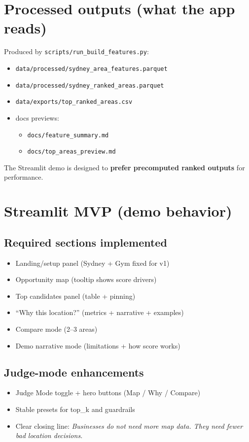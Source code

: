 \documentclass[11pt]{article}
\begin{document}
\section{Processed outputs (what the app reads)}
\noindent Produced by \texttt{scripts/run\_build\_features.py}:
\begin{itemize}
  \item \texttt{data/processed/sydney\_area\_features.parquet}
  \item \texttt{data/processed/sydney\_ranked\_areas.parquet}
  \item \texttt{data/exports/top\_ranked\_areas.csv}
  \item docs previews:
  \begin{itemize}
    \item \texttt{docs/feature\_summary.md}
    \item \texttt{docs/top\_areas\_preview.md}
  \end{itemize}
\end{itemize}

\noindent The Streamlit demo is designed to \textbf{prefer precomputed ranked outputs} for performance.

\section{Streamlit MVP (demo behavior)}

\subsection{Required sections implemented}
\begin{itemize}
  \item Landing/setup panel (Sydney + Gym fixed for v1)
  \item Opportunity map (tooltip shows score drivers)
  \item Top candidates panel (table + pinning)
  \item ``Why this location?'' (metrics + narrative + examples)
  \item Compare mode (2--3 areas)
  \item Demo narrative mode (limitations + how score works)
\end{itemize}

\subsection{Judge-mode enhancements}
\begin{itemize}
  \item Judge Mode toggle + hero buttons (Map / Why / Compare)
  \item Stable presets for top\_k and guardrails
  \item Clear closing line: \emph{Businesses do not need more map data. They need fewer bad location decisions.}
\end{itemize}
\end{document}
